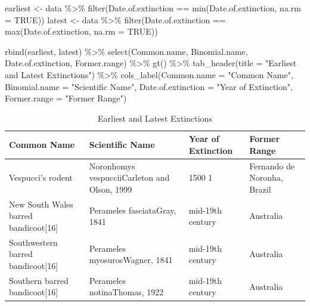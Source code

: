 \documentclass[
  letterpaper,
  DIV=11,
  numbers=noendperiod]{scrartcl}
\newenvironment{Shaded}{\begin{snugshade}}{\end{snugshade}}
\newcommand{\AttributeTok}[1]{\textcolor[rgb]{0.40,0.45,0.13}{#1}}
\newcommand{\ConstantTok}[1]{\textcolor[rgb]{0.56,0.35,0.01}{#1}}
\newcommand{\FunctionTok}[1]{\textcolor[rgb]{0.28,0.35,0.67}{#1}}
\newcommand{\NormalTok}[1]{\textcolor[rgb]{0.00,0.23,0.31}{#1}}
\newcommand{\OtherTok}[1]{\textcolor[rgb]{0.00,0.23,0.31}{#1}}
\newcommand{\SpecialCharTok}[1]{\textcolor[rgb]{0.37,0.37,0.37}{#1}}
\newcommand{\StringTok}[1]{\textcolor[rgb]{0.13,0.47,0.30}{#1}}
\begin{document}
\begin{Shaded}
\begin{Highlighting}[]
\NormalTok{earliest }\OtherTok{\textless{}{-}}\NormalTok{ data }\SpecialCharTok{\%\textgreater{}\%} \FunctionTok{filter}\NormalTok{(Date.of.extinction }\SpecialCharTok{==} \FunctionTok{min}\NormalTok{(Date.of.extinction, }\AttributeTok{na.rm =} \ConstantTok{TRUE}\NormalTok{))}
\NormalTok{latest }\OtherTok{\textless{}{-}}\NormalTok{ data }\SpecialCharTok{\%\textgreater{}\%} \FunctionTok{filter}\NormalTok{(Date.of.extinction }\SpecialCharTok{==} \FunctionTok{max}\NormalTok{(Date.of.extinction, }\AttributeTok{na.rm =} \ConstantTok{TRUE}\NormalTok{))}

\FunctionTok{rbind}\NormalTok{(earliest, latest) }\SpecialCharTok{\%\textgreater{}\%}
  \FunctionTok{select}\NormalTok{(Common.name, Binomial.name, Date.of.extinction, Former.range) }\SpecialCharTok{\%\textgreater{}\%}
  \FunctionTok{gt}\NormalTok{() }\SpecialCharTok{\%\textgreater{}\%}
  \FunctionTok{tab\_header}\NormalTok{(}\AttributeTok{title =} \StringTok{"Earliest and Latest Extinctions"}\NormalTok{) }\SpecialCharTok{\%\textgreater{}\%}
  \FunctionTok{cols\_label}\NormalTok{(}\AttributeTok{Common.name =} \StringTok{"Common Name"}\NormalTok{, }
             \AttributeTok{Binomial.name =} \StringTok{"Scientific Name"}\NormalTok{, }
             \AttributeTok{Date.of.extinction =} \StringTok{"Year of Extinction"}\NormalTok{, }
             \AttributeTok{Former.range =} \StringTok{"Former Range"}\NormalTok{)}
\end{Highlighting}
\end{Shaded}

\begin{table}
\caption*{
{\large Earliest and Latest Extinctions}
} 
\fontsize{12.0pt}{14.4pt}\selectfont
\begin{tabular*}{\linewidth}{@{\extracolsep{\fill}}llll}
\toprule
Common Name & Scientific Name & Year of Extinction & Former Range \\ 
\midrule\addlinespace[2.5pt]
Vespucci's rodent & Noronhomys vespucciiCarleton and Olson, 1999 & 1500 1 & Fernando de Noronha, Brazil \\ 
New South Wales barred bandicoot[16] & Perameles fasciataGray, 1841 & mid-19th century & Australia \\ 
Southwestern barred bandicoot[16] & Perameles myosurosWagner, 1841 & mid-19th century & Australia \\ 
Southern barred bandicoot[16] & Perameles notinaThomas, 1922 & mid-19th century & Australia \\ 
\bottomrule
\end{tabular*}
\end{table}
\end{document}
